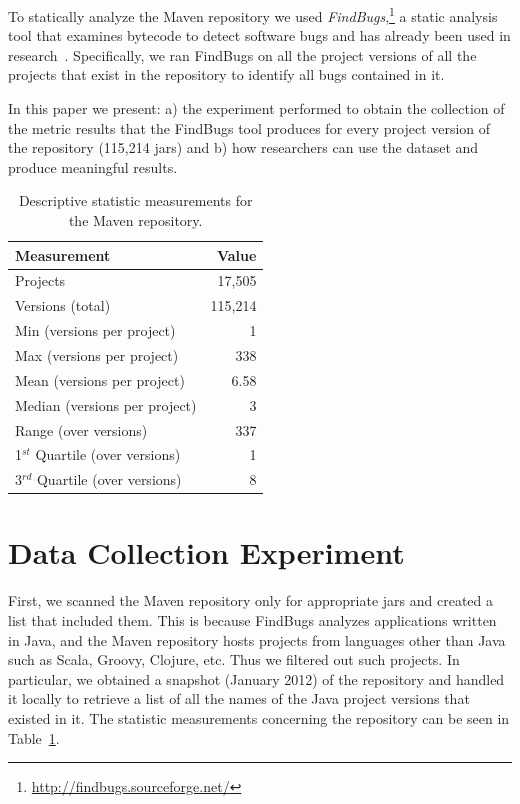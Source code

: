 \documentclass{sig-alternate}
\begin{document}
To statically analyze the Maven repository
we used {\it FindBugs},\footnote{\url{http://findbugs.sourceforge.net/}}
a static analysis tool that examines bytecode to detect software bugs
and has already been used in research~\cite{AP10,SHP06}.
Specifically, we ran FindBugs on all the project versions of all
the projects that exist in the repository
to identify all bugs contained in it.

In this paper we present: a) the experiment performed to obtain the
collection of the metric results that the FindBugs tool produces 
for every project version of the repository (115,214 {\sc jar}s)
and b) how researchers can use the dataset and produce
meaningful results.

\begin{table}
\centering
\begin{tabular}{l r}
\hline
Measurement & Value\\
 \hline
Projects & 17,505\\
Versions (total) & 115,214\\
Min (versions per project) & 1\\
Max (versions per project) & 338\\
Mean (versions per project) & 6.58\\
Median (versions per project) & 3\\
Range (over versions) & 337\\
1$^{st}$ Quartile (over versions) & 1\\
3$^{rd}$ Quartile (over versions) & 8\\
\hline
\end{tabular}
\caption{Descriptive statistic measurements for the Maven repository.}
\label{tbl:repository}
\end{table}

\section{Data Collection Experiment}
\label{sec:exp}

First, we scanned the Maven repository only
for appropriate {\sc jar}s and created a list that included them.
This is because FindBugs analyzes applications written in Java,
and the Maven repository hosts projects from
languages other than Java such as Scala, Groovy,
Clojure, etc. Thus we filtered out such projects.
In particular, we obtained a snapshot (January 2012) of
the repository and handled it locally to retrieve a list of all
the names of the Java project versions that existed in it.
The statistic measurements concerning the repository can be seen in 
Table~\ref{tbl:repository}.
\end{document}
